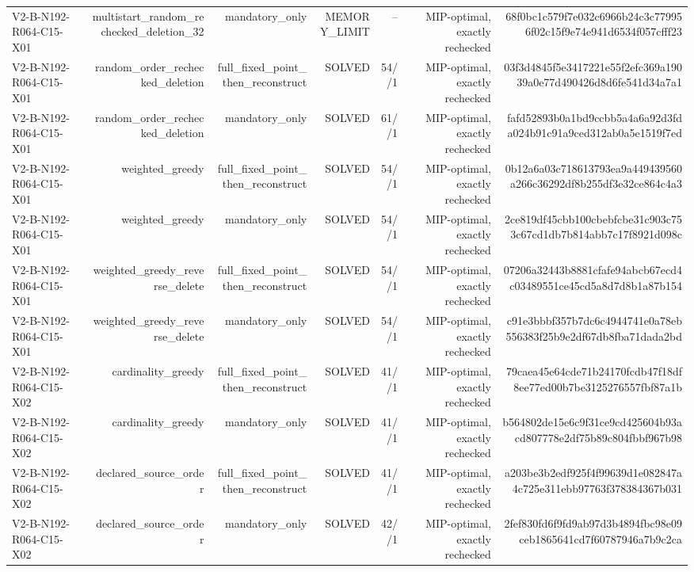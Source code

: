 {\begin{longtable}{lrrrrrr}
V2-B-N192-R064-C15-X01 & multistart\_random\_rechecked\_deletion\_32 & mandatory\_only & MEMORY\_LIMIT & -- & MIP-optimal, exactly rechecked & 68f0bc1c579f7e032c6966b24c3c779956f02c15f9e74e941d6534f057cfff23 \\
V2-B-N192-R064-C15-X01 & random\_order\_rechecked\_deletion & full\_fixed\_point\_then\_reconstruct & SOLVED & 54//1 & MIP-optimal, exactly rechecked & 03f3d4845f5e3417221e55f2efc369a19039a0e77d490426d8d6fe541d34a7a1 \\
V2-B-N192-R064-C15-X01 & random\_order\_rechecked\_deletion & mandatory\_only & SOLVED & 61//1 & MIP-optimal, exactly rechecked & fafd52893b0a1bd9ccbb5a4a6a92d3fda024b91c91a9ced312ab0a5e1519f7ed \\
V2-B-N192-R064-C15-X01 & weighted\_greedy & full\_fixed\_point\_then\_reconstruct & SOLVED & 54//1 & MIP-optimal, exactly rechecked & 0b12a6a03c718613793ea9a449439560a266c36292df8b255df3e32ce864c4a3 \\
V2-B-N192-R064-C15-X01 & weighted\_greedy & mandatory\_only & SOLVED & 54//1 & MIP-optimal, exactly rechecked & 2ce819df45cbb100cbebfcbe31c903c753c67cd1db7b814abb7c17f8921d098c \\
V2-B-N192-R064-C15-X01 & weighted\_greedy\_reverse\_delete & full\_fixed\_point\_then\_reconstruct & SOLVED & 54//1 & MIP-optimal, exactly rechecked & 07206a32443b8881cfafe94abcb67ecd4c03489551ce45cd5a8d7d8b1a87b154 \\
V2-B-N192-R064-C15-X01 & weighted\_greedy\_reverse\_delete & mandatory\_only & SOLVED & 54//1 & MIP-optimal, exactly rechecked & c91e3bbbf357b7dc6c4944741e0a78eb556383f25b9e2df67db8fba71dada2bd \\
V2-B-N192-R064-C15-X02 & cardinality\_greedy & full\_fixed\_point\_then\_reconstruct & SOLVED & 41//1 & MIP-optimal, exactly rechecked & 79caea45e64cde71b24170fcdb47f18df8ee77ed00b7be3125276557fbf87a1b \\
V2-B-N192-R064-C15-X02 & cardinality\_greedy & mandatory\_only & SOLVED & 41//1 & MIP-optimal, exactly rechecked & b564802de15e6c9f31ce9cd425604b93acd807778e2df75b89c804fbbf967b98 \\
V2-B-N192-R064-C15-X02 & declared\_source\_order & full\_fixed\_point\_then\_reconstruct & SOLVED & 41//1 & MIP-optimal, exactly rechecked & a203be3b2edf925f4f99639d1e082847a4c725e311ebb97763f378384367b031 \\
V2-B-N192-R064-C15-X02 & declared\_source\_order & mandatory\_only & SOLVED & 42//1 & MIP-optimal, exactly rechecked & 2fef830fd6f9fd9ab97d3b4894fbc98e09ceb1865641cd7f60787946a7b9c2ca \\

\end{longtable}}
